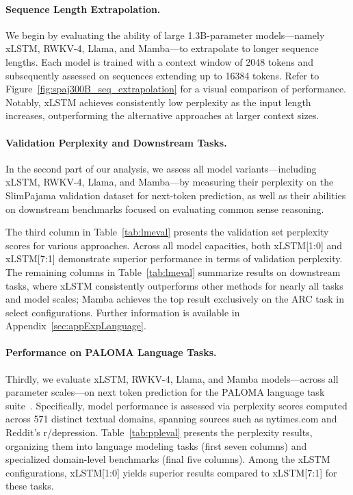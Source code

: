 \paragraph{Sequence Length Extrapolation.}
\label{sec:spaj300B_ctx_extrapolation}
We begin by evaluating the ability of large 1.3B-parameter models—namely xLSTM, RWKV-4, Llama, and Mamba—to extrapolate to longer sequence lengths. Each model is trained with a context window of 2048 tokens and subsequently assessed on sequences extending up to 16384 tokens. Refer to Figure~\ref{fig:spaj300B_seq_extrapolation} for a visual comparison of performance. Notably, xLSTM achieves consistently low perplexity as the input length increases, outperforming the alternative approaches at larger context sizes.

\paragraph{Validation Perplexity and Downstream Tasks.}
\label{sec:spaj_downstream_eval}
In the second part of our analysis, we assess all model variants—including xLSTM, RWKV-4, Llama, and Mamba—by measuring their perplexity on the SlimPajama validation dataset for next-token prediction, as well as their abilities on downstream benchmarks focused on evaluating common sense reasoning.

The third column in Table~\ref{tab:lmeval} presents the validation set perplexity scores for various approaches. Across all model capacities, both xLSTM[1:0] and xLSTM[7:1] demonstrate superior performance in terms of validation perplexity. The remaining columns in Table~\ref{tab:lmeval} summarize results on downstream tasks, where xLSTM consistently outperforms other methods for nearly all tasks and model scales; Mamba achieves the top result exclusively on the ARC task in select configurations. Further information is available in Appendix~\ref{sec:appExpLanguage}.

\paragraph{Performance on PALOMA Language Tasks.} Thirdly, we evaluate xLSTM, RWKV-4, Llama, and Mamba models—across all parameter scales—on next token prediction for the PALOMA language task suite~\citep{Magnusson:23arxivshort}. Specifically, model performance is assessed via perplexity scores computed across 571 distinct textual domains, spanning sources such as nytimes.com and Reddit’s r/depression. Table~\ref{tab:ppleval} presents the perplexity results, organizing them into language modeling tasks (first seven columns) and specialized domain-level benchmarks (final five columns). Among the xLSTM configurations, xLSTM[1:0] yields superior results compared to xLSTM[7:1] for these tasks.

